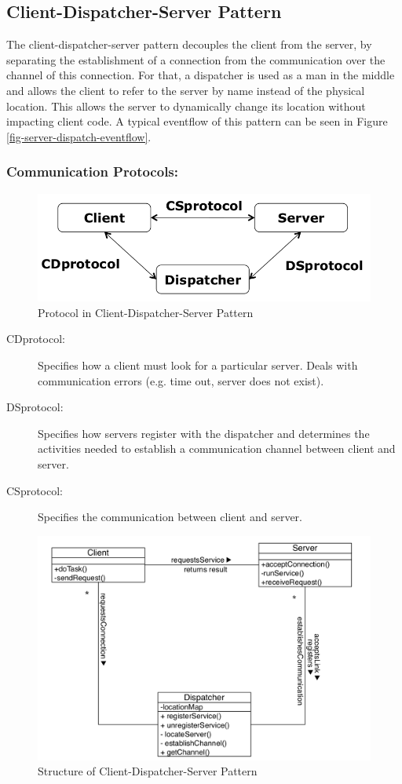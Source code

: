 \subsection{Client-Dispatcher-Server Pattern}
The client-dispatcher-server pattern decouples the client from the server, by separating the establishment of a connection from the communication over the channel of this connection.
For that, a dispatcher is used as a man in the middle and allows the client to refer to the server by name instead of the physical location.
This allows the server to dynamically change its location without impacting client code.
A typical eventflow of this pattern can be seen in Figure \ref{fig-server-dispatch-eventflow}.

\subsubsection*{Communication Protocols:}
\begin{figure}[H]
	\centering
	\includegraphics[width=0.7\linewidth]{images/protocol_dispatcher.png}
	\caption{Protocol in Client-Dispatcher-Server Pattern}
\end{figure}
\begin{description}
  \item[CDprotocol:] Specifies how a client must look for a particular server.
  Deals with communication errors (e.g. time out, server does not exist).
  \item[DSprotocol:] Specifies how servers register with the dispatcher and
  determines the activities needed to establish a communication
  channel between client and server.
  \item[CSprotocol:] Specifies the communication between client and server.
\end{description}

\begin{figure}[H]
	\centering
	\includegraphics[width=0.8\linewidth]{images/pattern_client_dispatcher_server.png}
	\caption{Structure of Client-Dispatcher-Server Pattern}
\end{figure}
\newpage

